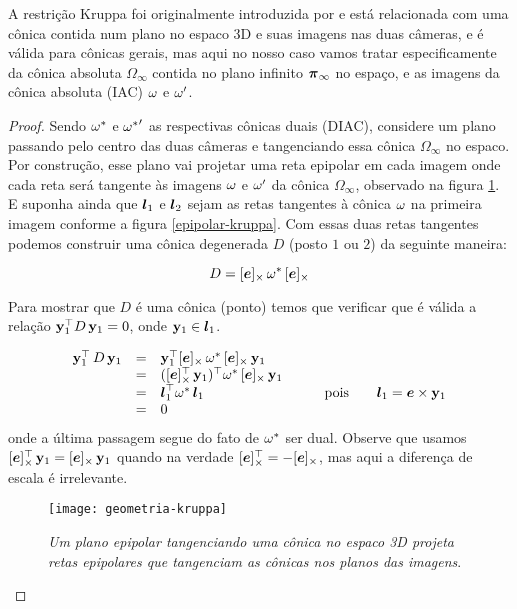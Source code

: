 A restrição Kruppa foi originalmente introduzida por \cite{faugeras92} e está relacionada com uma cônica contida num plano no espaco 3D e suas imagens nas duas câmeras, e é válida para cônicas gerais, mas aqui no nosso caso vamos tratar especificamente da cônica absoluta $\Omega_\infty$ contida no plano infinito $\boldsymbol{\pi}_\infty$ no espaço, e as imagens da cônica absoluta (IAC) ${\bf \omega}$ e ${\bf \omega'}$.


\begin{proof}
 Sendo ${\bf \omega}^*$ e ${{\bf \omega}^*}'$ as respectivas cônicas duais (DIAC), considere um plano passando pelo centro das duas câmeras e tangenciando essa cônica $\Omega_\infty$ no espaco. Por construção, esse plano vai projetar uma reta epipolar em cada imagem onde cada reta será tangente às imagens ${\bf \omega}$ e ${\bf \omega'}$ da cônica $\Omega_\infty$, observado na figura \ref{geometria-kruppa}. E suponha ainda que $\boldsymbol{l}_1$ e $\boldsymbol{l}_2$ sejam as retas tangentes à cônica ${\bf \omega}$ na primeira imagem conforme a figura \ref{epipolar-kruppa}. Com essas duas retas tangentes podemos construir uma cônica degenerada $D$ (posto $1$ ou $2$) da seguinte maneira:  

\begin{equation}\label{eq.def.con.deg}
D=[\boldsymbol{e}]_\times\,{\bf \omega}^*\,[\boldsymbol{e}]_\times 
\end{equation}

Para mostrar que $D$ é uma cônica (ponto) temos que verificar que é válida a relação ${\bf y}_1^\top D\,{\bf y}_1=0$, onde ${\bf y}_1\in\boldsymbol{l}_1$.

\begin{equation*}
\begin{array}{rcll}
{\bf y}_1^\top\,D\,{\bf y}_1&=&{\bf y}_1^\top [\boldsymbol{e}]_\times\,{\bf \omega}^*\,[\boldsymbol{e}]_\times\,{\bf y}_1&\\
&=&([\boldsymbol{e}]^\top_\times\,{\bf y}_1)^\top {\bf \omega}^*\,[\boldsymbol{e}]_\times\,{\bf y}_1&\\
&=&\boldsymbol{l}_1^\top {\bf \omega}^*\,\boldsymbol{l}_1& \qquad\text{pois}\qquad\boldsymbol{l}_1=\boldsymbol{e}\times{\bf y}_1\\
&=&0&
\end{array}
\end{equation*}
onde a última passagem segue do fato de ${\bf \omega}^*$ ser dual. Observe que usamos $[\boldsymbol{e}]^\top_\times\,{\bf y}_1=[\boldsymbol{e}]_\times\,{\bf y}_1$ quando na verdade $[\boldsymbol{e}]^\top_\times=-[\boldsymbol{e}]_\times$, mas aqui a diferença de escala é irrelevante. 

\begin{figure}[!htb]
\centering
\texttt{[image: geometria-kruppa]}
\caption{\textit{Um plano epipolar tangenciando uma cônica no espaco 3D projeta retas epipolares que tangenciam as cônicas nos planos das imagens}.}
\label{geometria-kruppa}
\end{figure}


\end{proof}
